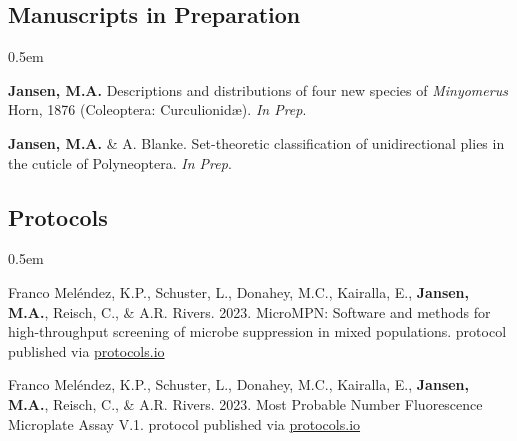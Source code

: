 \documentclass[12pt,a4paper]{article}
\begin{document}
\subsection*{Manuscripts in Preparation}
\begin{description}
	\itemsep0.5em
	\item \textbf{Jansen, M.A.} Descriptions and distributions of four new species of \textit{Minyomerus} Horn, 1876 (Coleoptera: Curculionid\ae). \textit{In Prep}.
	\item \textbf{Jansen, M.A.} \& A. Blanke. Set-theoretic classification of unidirectional plies in the cuticle of Polyneoptera. \textit{In Prep}.
\end{description}

\subsection*{Protocols}
\begin{description}
	\itemsep0.5em
	\item Franco Mel\'{e}ndez, K.P., Schuster, L., Donahey, M.C., Kairalla, E., \textbf{Jansen, M.A.}, Reisch, C., \& A.R. Rivers. 2023. MicroMPN: Software and methods for high-throughput screening of microbe suppression in mixed populations. protocol published via \href{dx.doi.org/10.17504/protocols.io.81wgbymenvpk/v1}{protocols.io}
	\item Franco Mel\'{e}ndez, K.P., Schuster, L., Donahey, M.C., Kairalla, E., \textbf{Jansen, M.A.}, Reisch, C., \& A.R. Rivers. 2023. Most Probable Number Fluorescence Microplate Assay V.1. protocol published via \href{dx.doi.org/10.17504/protocols.io.q26g7yqk1gwz/v1}{protocols.io}
\end{description}
\end{document}

